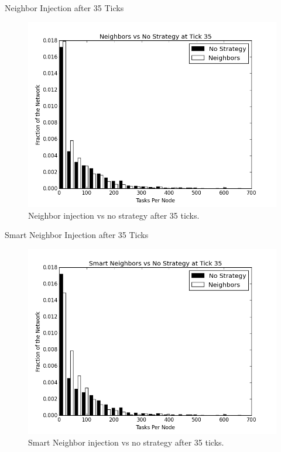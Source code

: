 \documentclass[11pt]{beamer}
\begin{document}
\begin{frame}{Neighbor Injection after 35 Ticks}
\begin{figure}
	\centering
	\includegraphics[width=0.7\linewidth]{figs/neighborsStableHist35}
	\caption[Neighbor injection  vs no strategy after 35 ticks.]{Neighbor injection  vs no strategy after 35 ticks.}
	\label{fig:neighborsStableHist35}
\end{figure}

\end{frame}


\begin{frame}{Smart Neighbor Injection after 35 Ticks}
\begin{figure}
	\centering
	\includegraphics[width=0.7\linewidth]{figs/neighborsStableSmartHist35}
	\caption[Smart Neighbor injection  vs no strategy after 35 ticks.]{Smart Neighbor injection  vs no strategy after 35 ticks.}
	\label{fig:neighborsStableSmartHist35}
\end{figure}
\end{frame}
\end{document}
